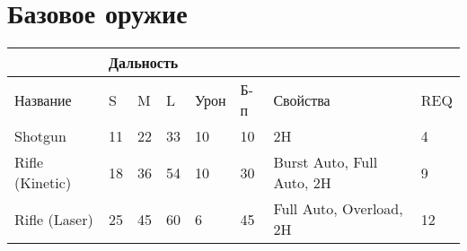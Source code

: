     \section*{Базовое оружие}
        \begin{table}[H]
            \centering
            \begin{tabular}{|l|lll|l|l|l|l|}
                \hline
                                & \multicolumn{3}{l|}{Дальность}                         &      &     &                           &     \\ \hline
                Название        & \multicolumn{1}{l|}{S}  & \multicolumn{1}{l|}{M}  & L  & Урон & Б-п & Свойства                  & REQ \\ \hline
                Shotgun         & \multicolumn{1}{l|}{11} & \multicolumn{1}{l|}{22} & 33 & 10   & 10  & 2H                        & 4   \\ \hline
                Rifle (Kinetic) & \multicolumn{1}{l|}{18} & \multicolumn{1}{l|}{36} & 54 & 10   & 30  & Burst Auto, Full Auto, 2H & 9   \\ \hline
                Rifle (Laser)   & \multicolumn{1}{l|}{25} & \multicolumn{1}{l|}{45} & 60 & 6    & 45  & Full Auto, Overload, 2H   & 12  \\ \hline
            \end{tabular}
        \end{table}

